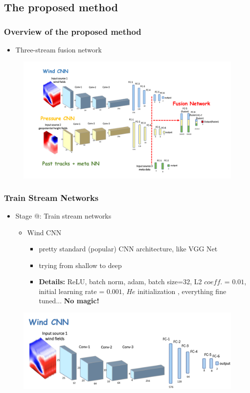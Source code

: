 \documentclass{beamer}
\makeatletter
\newcommand{\Rmnum}[1]{\expandafter\@slowromancap\romannumeral #1@}
\makeatother
\begin{document}
\subsection{The proposed method}
\begin{frame}
\frametitle{Overview of the proposed method}
\begin{itemize}
	\item  Three-stream fusion network \\
\end{itemize}
\begin{figure}
	\includegraphics[width=0.8\linewidth]{figs/fusion_network.pdf}
\end{figure}
\end{frame}


\begin{frame}
\frametitle{Train Stream Networks}
\begin{itemize}
	\item  Stage \Rmnum{1}: Train stream networks \\
	\begin{itemize}
		\item Wind CNN
		\begin{itemize}
			\item pretty standard (popular) CNN architecture, like VGG Net \cite{simonyan2014very}
			\item trying from shallow to deep
			\item \textbf{Details:} ReLU, batch norm, adam, batch size=$32$, L2 $coeff.$ = $0.01$, initial learning rate = $0.001$, $He$ initialization \cite{he2015delving}, everything fine tuned... \textbf{No magic!}
		\end{itemize}
	\end{itemize}
\end{itemize}
\begin{figure}
	\includegraphics[width=0.8\linewidth]{figs/wind-cnn.png}
\end{figure}
\end{frame}
\end{document}
